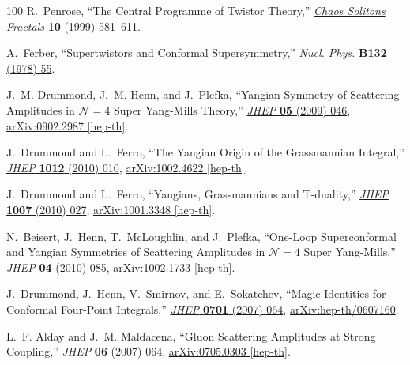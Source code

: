 \documentclass[12pt,hyperref,compress]{JHEP3}
\begin{document}
\begin{thebibliography}{100}
R.~Penrose, ``{The Central Programme of Twistor Theory},''
\href{http://dx.doi.org/10.1016/S0960-0779(98)00333-6}{{\em Chaos Solitons
  Fractals} {\bf 10} (1999)  581--611}.

A.~Ferber, ``{Supertwistors and Conformal Supersymmetry},''
\href{http://dx.doi.org/10.1016/0550-3213(78)90257-2}{{\em Nucl. Phys.} {\bf
  B132} (1978)  55}.

J.~M. Drummond, J.~M. Henn, and J.~Plefka, ``{Yangian Symmetry of Scattering
  Amplitudes in $\mathcal{N}\!=\!4$ Super Yang-Mills Theory},''
  \href{http://dx.doi.org/10.1088/1126-6708/2009/05/046}{{\em JHEP} {\bf 05}
  (2009)  046},
\href{http://arxiv.org/abs/0902.2987}{{ arXiv:0902.2987 [hep-th]}}.

J.~Drummond and L.~Ferro, ``{The Yangian Origin of the Grassmannian
  Integral},'' \href{http://dx.doi.org/10.1007/JHEP12(2010)010}{{\em JHEP} {\bf
  1012} (2010)  010},
\href{http://arxiv.org/abs/1002.4622}{{ arXiv:1002.4622 [hep-th]}}.

J.~Drummond and L.~Ferro, ``{Yangians, Grassmannians and T-duality},''
  \href{http://dx.doi.org/10.1007/JHEP07(2010)027}{{\em JHEP} {\bf 1007} (2010)
   027},
\href{http://arxiv.org/abs/1001.3348}{{ arXiv:1001.3348 [hep-th]}}.

N.~Beisert, J.~Henn, T.~McLoughlin, and J.~Plefka, ``{One-Loop Superconformal
  and Yangian Symmetries of Scattering Amplitudes in $\mathcal{N}\!=\!4$ Super
  Yang-Mills},'' \href{http://dx.doi.org/10.1007/JHEP04(2010)085}{{\em JHEP}
  {\bf 04} (2010)  085},
\href{http://arxiv.org/abs/1002.1733}{{ arXiv:1002.1733 [hep-th]}}.

J.~Drummond, J.~Henn, V.~Smirnov, and E.~Sokatchev, ``{Magic Identities for
  Conformal Four-Point Integrals},''
  \href{http://dx.doi.org/10.1088/1126-6708/2007/01/064}{{\em JHEP} {\bf 0701}
  (2007)  064},
\href{http://arxiv.org/abs/hep-th/0607160}{{ arXiv:hep-th/0607160}}.

L.~F. Alday and J.~M. Maldacena, ``{Gluon Scattering Amplitudes at Strong
  Coupling},'' {\em JHEP} {\bf 06} (2007)  064,
\href{http://arxiv.org/abs/0705.0303}{{ arXiv:0705.0303 [hep-th]}}.


\end{thebibliography}
\end{document}
